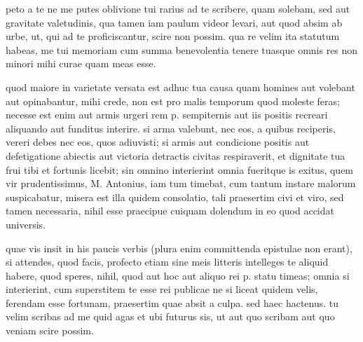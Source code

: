


 peto a te ne me putes oblivione tui rarius ad te scribere, quam solebam, sed aut gravitate valetudinis, qua tamen iam paulum videor levari, aut quod absim ab urbe, ut, qui ad te proficiscantur, scire non possim. qua re velim ita statutum habeas, me tui memoriam cum summa benevolentia tenere tuasque omnis res non minori mihi curae quam meas esse.

 quod maiore in varietate versata est adhuc tua causa quam homines aut volebant aut opinabantur, mihi crede, non est pro malis temporum quod moleste feras; necesse est enim aut armis urgeri rem p. sempiternis aut iis positis recreari aliquando aut funditus interire. si arma valebunt, nec eos, a quibus reciperis, vereri debes nec eos, quos adiuvisti; si armis aut condicione positis aut defetigatione abiectis aut victoria detractis civitas respiraverit, et dignitate tua frui tibi et fortunis licebit; sin omnino interierint omnia fueritque is exitus, quem vir prudentissimus, M. Antonius, iam tum timebat, cum tantum instare malorum suspicabatur, misera est illa quidem consolatio, tali praesertim civi et viro, sed tamen necessaria, nihil esse praecipue cuiquam dolendum in eo quod accidat universis.

 quae vis insit in his paucis verbis (plura enim committenda epistulae non erant), si attendes, quod facis, profecto etiam sine meis litteris intelleges te aliquid habere, quod speres, nihil, quod aut hoc aut aliquo rei p. statu timeas; omnia si interierint, cum superstitem te esse rei publicae ne si liceat quidem velis, ferendam esse fortunam, praesertim quae absit a culpa. sed haec hactenus. tu velim scribas ad me quid agas et ubi futurus sis, ut aut quo scribam aut quo veniam scire possim.

